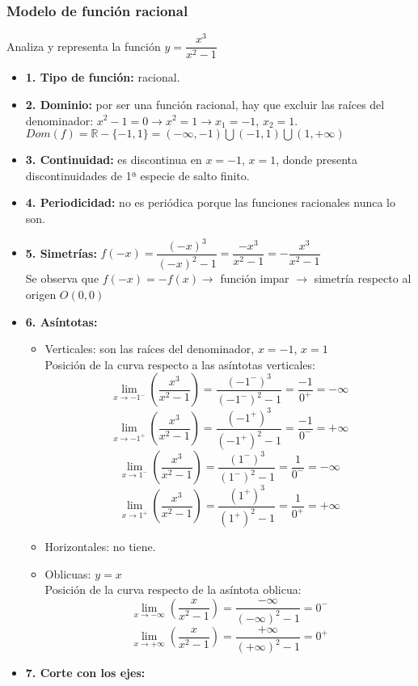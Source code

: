 \subsubsection{Modelo de función racional}
Analiza y representa la función $y=\dfrac{x^3}{x^2-1}$
\begin{itemize}
	\item \textbf{1. Tipo de función: }racional.
	\item \textbf{2. Dominio: }por ser una función racional, hay que excluir las raíces del denominador: $x^2-1=0 \rightarrow x^2=1 \rightarrow x_1=-1$, $x_2=1$.\\
	$Dom(f) = \mathbb{R}-\{-1,1\} = (-\infty, -1) \bigcup (-1,1) \bigcup (1,+\infty)$
	\item \textbf{3. Continuidad: }es discontinua en $x=-1$, $x=1$, donde presenta discontinuidades de 1ª especie de salto finito.
	\item \textbf{4. Periodicidad: }no es periódica porque las funciones racionales nunca lo son.
	\item \textbf{5. Simetrías: }$f(-x)=\dfrac{(-x)^3}{(-x)^2-1}=\dfrac{-x^3}{x^2-1}=-\dfrac{x^3}{x^2-1}$\\
	Se observa que $f(-x) = -f(x) \rightarrow$ función impar $\rightarrow$ simetría respecto al origen $O(0,0)$
	\item \textbf{6. Asíntotas: }
	\begin{itemize}
		\item Verticales: son las raíces del denominador, $x=-1$, $x=1$\\
		Posición de la curva respecto a las asíntotas verticales:\\
		$$\lim_{x \to -1^{-}}(\dfrac{x^3}{x^2-1})=\dfrac{(-1^{-})^3}{(-1^{-})^2-1}=\dfrac{-1}{0^{+}}=-\infty$$
		$$\lim_{x \to -1^{+}}(\dfrac{x^3}{x^2-1})=\dfrac{(-1^{+})^3}{(-1^{+})^2-1}=\dfrac{-1}{0^{-}}=+\infty$$
		$$\lim_{x \to 1^{-}}(\dfrac{x^3}{x^2-1})=\dfrac{(1^{-})^3}{(1^{-})^2-1}=\dfrac{1}{0^{-}}=-\infty$$
		$$\lim_{x \to 1^{+}}(\dfrac{x^3}{x^2-1})=\dfrac{(1^{+})^3}{(1^{+})^2-1}=\dfrac{1}{0^{+}}=+\infty$$
		\item Horizontales: no tiene.
		\item Oblicuas: $y=x$\\
		Posición de la curva respecto de la asíntota oblicua:
		$$\lim_{x \to -\infty}(\dfrac{x}{x^2-1})=\dfrac{-\infty}{(-\infty)^2-1}=0^{-}$$
		$$\lim_{x \to +\infty}(\dfrac{x}{x^2-1})=\dfrac{+\infty}{(+\infty)^2-1}=0^{+}$$
	\end{itemize}
	\item \textbf{7. Corte con los ejes:}

\end{itemize}
